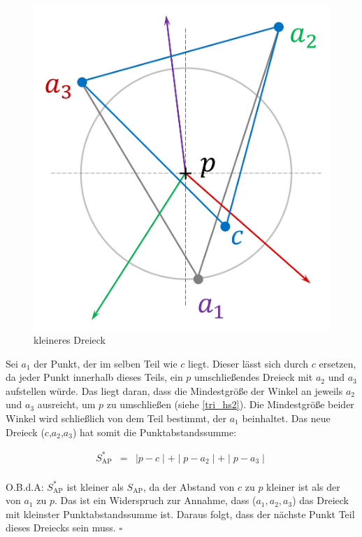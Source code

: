 \documentclass[a4paper]{extarticle}
\begin{document}
    \begin{figure}[!ht]
        \centering	
        \includegraphics[scale=0.15]{bilder/tri_3.pdf}
        \caption{kleineres Dreieck}
        \label{fig:triangulation_3}
    \end{figure}

    Sei $a_1$ der Punkt, der im selben Teil wie $c$ liegt. Dieser lässt sich durch $c$ ersetzen, 
    da jeder Punkt innerhalb dieses Teils, ein $p$ umschließendes Dreieck mit $a_2$ und $a_3$ 
    aufstellen würde. Das liegt daran, dass die Mindestgröße der 
    Winkel an jeweils $a_2$ und $a_3$ ausreicht, um $p$ zu umschließen (siehe \ref{tri_hs2}).
    Die Mindestgröße beider Winkel wird schließlich von dem Teil bestimmt, der $a_1$ beinhaltet.
    Das neue Dreieck ($c$,$a_2$,$a_3$) hat somit die Punktabstandssumme:

    \begin{eqnarray*}
        S^*_{\text{AP}} &=& \mid p - c \mid + \mid p - a_2 \mid + \mid p - a_3 \mid \\
    \end{eqnarray*}

    O.B.d.A: $S^*_{\text{AP}}$ ist kleiner als $S_{\text{AP}}$, da der Abstand von $c$ zu $p$
    kleiner ist als der von $a_1$ zu $p$. Das ist ein Widerspruch zur Annahme, dass ($a_1, a_2, a_3$) 
    das Dreieck mit kleinster Punktabstandssumme ist. Daraus folgt, dass der nächste
    Punkt Teil dieses Dreiecks sein muss. $\square$
\end{document}

